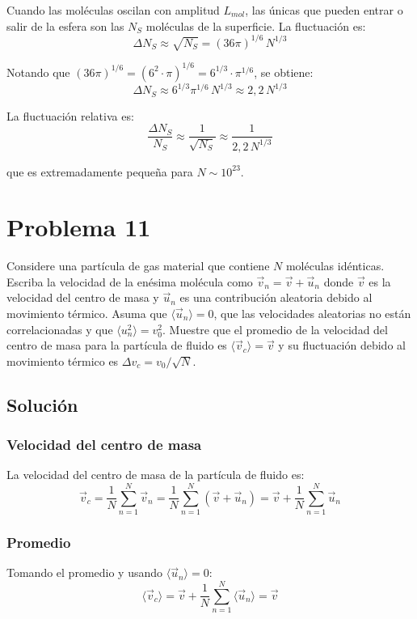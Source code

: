\documentclass[a4paper]{article}
\begin{document}
Cuando las moléculas oscilan con amplitud $L_{mol}$, las únicas que pueden entrar o salir de la esfera son las $N_S$ moléculas de la superficie. La fluctuación es:
$$
\Delta N_S \approx \sqrt{N_S} = (36\pi)^{1/6}\, N^{1/3}
$$

Notando que $(36\pi)^{1/6} = (6^2\cdot\pi)^{1/6} = 6^{1/3}\cdot\pi^{1/6}$, se obtiene:
$$
\boxed{\Delta N_S \approx 6^{1/3}\pi^{1/6}\, N^{1/3} \approx 2{,}2\, N^{1/3}}
$$

La fluctuación relativa es:
$$
\frac{\Delta N_S}{N_S} \approx \frac{1}{\sqrt{N_S}} \approx \frac{1}{2{,}2\, N^{1/3}}
$$

que es extremadamente pequeña para $N \sim 10^{23}$.

\section{Problema 11}
Considere una partícula de gas material que contiene $N$ moléculas idénticas. Escriba la velocidad de la enésima molécula como $\vec{v}_n = \vec{v} + \vec{u}_n$ donde $\vec{v}$ es la velocidad del centro de masa y $\vec{u}_n$ es una contribución aleatoria debido al movimiento térmico. Asuma que $\langle \vec{u}_n \rangle = 0$, que las velocidades aleatorias no están correlacionadas y que $\langle u_n^2 \rangle = v_0^2$. Muestre que el promedio de la velocidad del centro de masa para la partícula de fluido es $\langle \vec{v}_c \rangle = \vec{v}$ y su fluctuación debido al movimiento térmico es $\Delta v_c = v_0/\sqrt{N}$.

\subsection{Solución}

\subsubsection{Velocidad del centro de masa}

La velocidad del centro de masa de la partícula de fluido es:
$$
\vec{v}_c = \frac{1}{N}\sum_{n=1}^{N} \vec{v}_n = \frac{1}{N}\sum_{n=1}^{N}(\vec{v} + \vec{u}_n) = \vec{v} + \frac{1}{N}\sum_{n=1}^{N}\vec{u}_n
$$

\subsubsection{Promedio}

Tomando el promedio y usando $\langle \vec{u}_n \rangle = 0$:
$$
\langle \vec{v}_c \rangle = \vec{v} + \frac{1}{N}\sum_{n=1}^{N}\langle \vec{u}_n \rangle = \vec{v}
$$
\end{document}
